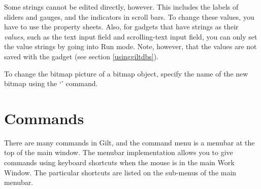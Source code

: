 Some strings cannot be edited directly, however.  This includes the
labels of sliders and gauges, and the indicators in scroll bars.  To
change these values, you have to use the property sheets.  Also,
for gadgets that have strings as their {\it values}, such as the text input
field and scrolling-text input field, you can only set the value
strings by going into Run mode.  Note, however, that the values are
not saved with the gadget (see section \ref{usinggiltdbs}).

To change the bitmap picture of a bitmap object, specify the name of
the new bitmap using the `' command.


\section{Commands}

There are many commands in Gilt, and the command menu is a menubar
at the top of the main window.  The menubar implementation allows you to
give commands using keyboard shortcuts when the mouse is in the main
Work Window.
The particular shortcuts are listed on the sub-menus of the main
menubar.

